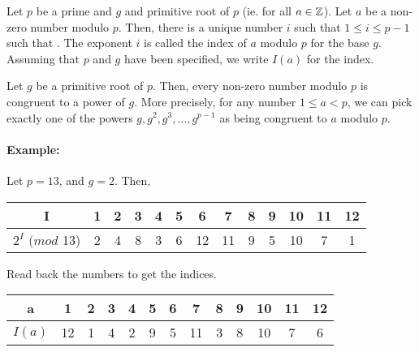 \documentclass[../main.tex]{subfiles}
\begin{document}
\begin{defn}
    Let $p$ be a prime and $g$ and primitive root of $p$ (ie.  for all $a \in \mathbb{Z}$). Let $a$ be a non-zero number modulo $p$. Then, there is a unique number $i$ such that $1 \leq i \leq p-1$ such that . The exponent $i$ is called the index of $a$ modulo $p$ for the base $g$. Assuming that $p$ and $g$ have been specified, we write $I(a)$ for the index.
\end{defn}

\begin{prop}
    Let $g$ be a primitive root of $p$. Then, every non-zero number modulo $p$ is congruent to a power of $g$. More precisely, for any number $1 \leq a < p$, we can pick exactly one of the powers $g, g^2, g^3,...,g^{p-1}$ as being congruent to $a$ modulo $p$.
\end{prop}
\paragraph{Example:} Let $p=13$, and $g=2$. Then, \\

\begin{center}
    \begin{tabular}{ c|c c c c c c c c c c c c } 
        I & 1 & 2 & 3 & 4 & 5 & 6 & 7 & 8 & 9 & 10 & 11 & 12 \\
        \hline
        $2^I$ $(mod$ 13) & 2 & 4 & 8 & 3 & 6 & 12 & 11 & 9 & 5 & 10 & 7 & 1\\ 
    \end{tabular}
\end{center}
Read back the numbers to get the indices.
\begin{center}
    \begin{tabular}{ c|c c c c c c c c c c c c } 
        a & 1 & 2 & 3 & 4 & 5 & 6 & 7 & 8 & 9 & 10 & 11 & 12 \\
        \hline
        $I(a)$ & 12 & 1 & 4 & 2 & 9 & 5 & 11 & 3 & 8 & 10 & 7 & 6\\ 
    \end{tabular}
\end{center}
\end{document}
